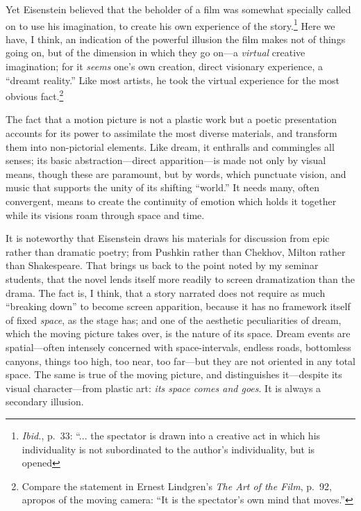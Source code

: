 \documentclass{tufte-handout}
\begin{document}
Yet Eisenstein believed that the beholder of a film was somewhat
specially called on to use his imagination, to create his own experience
of the story.\footnote{\emph{Ibid.}, p.~33: ``... the spectator is drawn
  into a creative act in which his individuality is not subordinated to
  the author's individuality, but is opened} Here we have, I think, an
indication of the powerful illu­sion the film makes not of things going
on, but of the dimension in which they go on---a \emph{virtual} creative
imagination; for it \emph{seems} one's own crea­tion, direct visionary
experience, a ``dreamt reality.'' Like most artists, he took the virtual
experience for the most obvious fact.\footnote{Compare the statement in
  Ernest Lindgren's \emph{The Art of the Film}, p.~92, apropos of the
  moving camera: ``It is the spectator's own mind that moves.''}

The fact that a motion picture is not a plastic work but a poetic
presentation accounts for its power to assimilate the most diverse
ma­terials, and transform them into non-pictorial elements. Like dream,
it enthralls and commingles all senses; its basic abstraction---direct
appari­tion---is made not only by visual means, though these are
paramount, but by words, which punctuate vision, and music that supports
the unity of its shifting ``world.'' It needs many, often convergent,
means to create the continuity of emotion which holds it together while
its visions roam through space and time.

It is noteworthy that Eisenstein draws his materials for discussion from
epic rather than dramatic poetry; from Pushkin rather than Chekhov,
Milton rather than Shakespeare. That brings us back to the point noted
by my seminar students, that the novel lends itself more readily to
screen dramatization than the drama. The fact is, I think, that a story
narrated does not require as much ``breaking down'' to become screen
apparition, because it has no framework itself of fixed \emph{space}, as
the stage has; and one of the aesthetic peculiarities of dream, which
the moving picture takes over, is the nature of its space. Dream events
are spatial---often intensely concerned with space-intervals, endless
roads, bottomless canyons, things too high, too near, too far---but they
are not oriented in any total space. The same is true of the moving
picture, and distinguishes it---despite its visual character---from
plastic art: \emph{its space comes and goes}. It is always a secondary
illusion.
\end{document}
